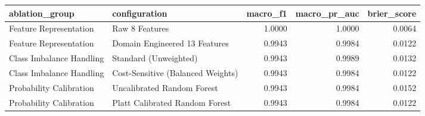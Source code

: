 \begin{tabular}{llrrr}
\toprule
ablation_group & configuration & macro_f1 & macro_pr_auc & brier_score \\
\midrule
Feature Representation & Raw 8 Features & 1.0000 & 1.0000 & 0.0064 \\
Feature Representation & Domain Engineered 13 Features & 0.9943 & 0.9984 & 0.0122 \\
Class Imbalance Handling & Standard (Unweighted) & 0.9943 & 0.9989 & 0.0132 \\
Class Imbalance Handling & Cost-Sensitive (Balanced Weights) & 0.9943 & 0.9984 & 0.0122 \\
Probability Calibration & Uncalibrated Random Forest & 0.9943 & 0.9984 & 0.0152 \\
Probability Calibration & Platt Calibrated Random Forest & 0.9943 & 0.9984 & 0.0122 \\
\bottomrule
\end{tabular}
